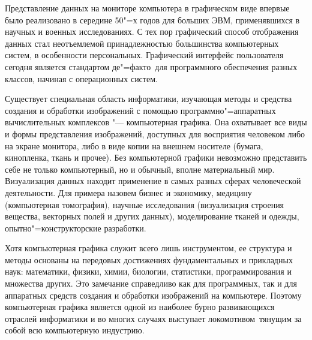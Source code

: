Представление данных на мониторе компьютера в графическом виде впервые было реализовано в середине 50"=х годов для больших ЭВМ, применявшихся в научных и военных исследованиях. С тех пор графический способ отображения данных стал неотъемлемой принадлежностью большинства компьютерных систем, в особенности персональных. Графический интерфейс пользователя сегодня является стандартом \flqq де"=факто\frqq\ для программного обеспечения разных классов, начиная с операционных систем.

Существует специальная область информатики, изучающая методы и средства создания и обработки изображений с помощью программно"=аппаратных вычислительных комплексов "--- компьютерная графика. Она охватывает все виды и формы представления изображений, доступных для восприятия человеком либо на экране монитора, либо в виде копии на внешнем носителе (бумага, кинопленка, ткань и прочее). Без компьютерной графики невозможно представить себе не только компьютерный, но и обычный, вполне материальный мир. Визуализация данных находит применение в самых разных сферах человеческой деятельности. Для примера назовем бизнес и экономику, медицину (компьютерная томография), научные исследования (визуализация строения вещества, векторных полей и других данных), моделирование тканей и одежды, опытно"=конструкторские разработки.

Хотя компьютерная графика служит всего лишь инструментом, ее структура и методы основаны на передовых достижениях фундаментальных и прикладных наук: математики, физики, химии, биологии, статистики, программирования и множества других. Это замечание справедливо как для программных, так и для аппаратных средств создания и обработки изображений на компьютере. Поэтому компьютерная графика является одной из наиболее бурно развивающихся отраслей информатики и во многих случаях выступает \flqq локомотивом\frqq\, тянущим за собой всю компьютерную индустрию.